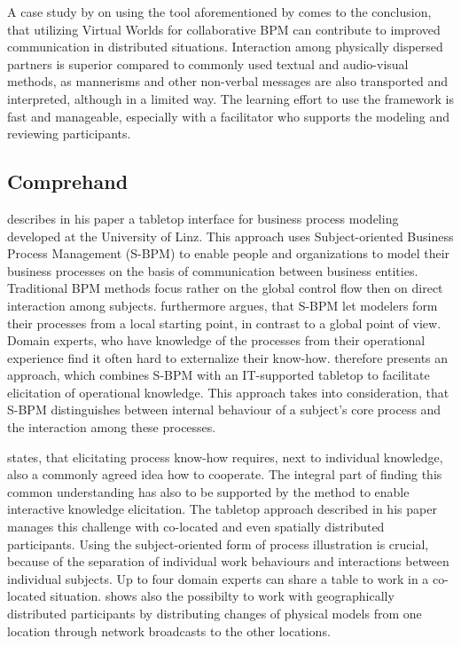 	A case study by  on using the tool aforementioned by  comes to the conclusion, that
	utilizing Virtual Worlds for collaborative BPM can contribute to improved communication in distributed situations.
	Interaction among physically dispersed partners is superior compared to commonly used textual and audio-visual methods, 
	as mannerisms and other non-verbal messages are also transported and interpreted, although in a limited way. The learning
	effort to use the framework is fast and manageable, especially with a facilitator who supports the modeling and reviewing
	participants. 
	
	\subsection{Comprehand}
		
	 describes in his paper a tabletop interface for business process modeling developed at the University
	of Linz. This approach uses Subject-oriented Business Process Management (S-BPM) to enable people and organizations to 
	model their business processes on the basis of communication between business entities. Traditional BPM methods focus
	rather on the global control flow then on direct interaction among subjects.  furthermore argues, that S-BPM let 
	modelers form their processes from a local starting point, in contrast to a global point of view. Domain experts, who have
	knowledge of the processes from their operational experience find it often hard to externalize their know-how. 
	therefore presents an approach, which combines S-BPM with an IT-supported tabletop to facilitate elicitation of operational
	knowledge. This approach takes into consideration, that S-BPM distinguishes between internal behaviour of a subject's core
	process and the interaction among these processes.
	
	 states, that elicitating process know-how requires, next to individual knowledge, also a commonly agreed idea
	how to cooperate. The integral part of finding this common understanding has also to be supported by the method to enable interactive
	knowledge elicitation. The tabletop approach described in his paper manages this challenge with co-located and even spatially
	distributed participants. Using the subject-oriented form of process illustration is crucial, because of the separation
	of individual work behaviours and interactions between individual subjects. Up to four domain experts can share a table to
	work in a co-located situation.  shows also the possibilty to work with geographically distributed participants 
	by distributing changes of physical models from one location through network broadcasts to the other locations.
	
